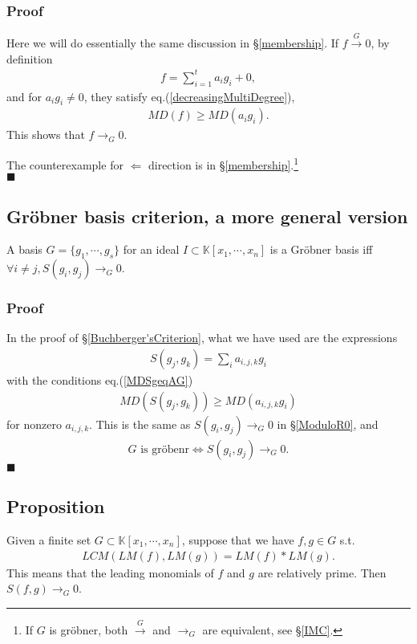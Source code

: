 \documentclass[11pt]{book}
\begin{document}
\subsubsection{Proof}
Here we will do essentially the same discussion in \S\ref{membership}.
If $f \stackrel{G}{\to} 0$, by definition
\begin{eqnarray}
f = \sum_{i=1}^t a_i g_i + 0,
\end{eqnarray}
and for $a_i g_i \neq 0$, they satisfy eq.(\ref{decreasingMultiDegree}),
\begin{eqnarray}
MD(f) \geq MD(a_i g_i).
\end{eqnarray}
This shows that $f \to_G 0$.

The counterexample for $\Leftarrow$ direction is in \S\ref{membership}.\footnote{If $G$ is gr\"obner, both $\stackrel{G}{\to}$ and $\to_G$ are equivalent, see \S\ref{IMC}.}
\\
$\blacksquare$

\subsection{Gr\"obner basis criterion, a more general version}
\label{efficientGCriterion}
A basis $G = \{g_1, \cdots, g_s\}$ for an ideal $I \subset \mathbb{K}[x_1, \cdots, x_n]$ is a Gr\"obner basis iff $\forall i \neq j, S(g_i, g_j) \to_G 0$.

\subsubsection{Proof}
In the proof of \S\ref{Buchberger'sCriterion}, what we have used are the expressions
\begin{eqnarray}
S(g_j, g_k) = \sum_{i} a_{i,j,k} g_i
\end{eqnarray}
with the conditions eq.(\ref{MDSgeqAG})
\begin{eqnarray}
MD\left(S(g_j, g_k) \right) \geq MD( a_{i,j,k} g_i)
\end{eqnarray}
for nonzero $a_{i,j,k}$.
This is the same as $S(g_i, g_j) \to_G 0$ in \S\ref{ModuloR0}, and
\begin{eqnarray}
G \text{ is gr\"obenr} \Leftrightarrow S(g_i, g_j) \to_G 0.
\end{eqnarray}
$\blacksquare$

\subsection{Proposition}
Given a finite set $G \subset \mathbb{K}[x_1, \cdots, x_n]$, suppose that we have $f,g \in G$ s.t.
\begin{eqnarray}
\label{relativelyPrime}
LCM( LM(f), LM(g)) = LM(f) * LM(g).
\end{eqnarray}
This means that the leading monomials of $f$ and $g$ are relatively prime.
Then $S(f,g) \to_G 0$.
\end{document}
